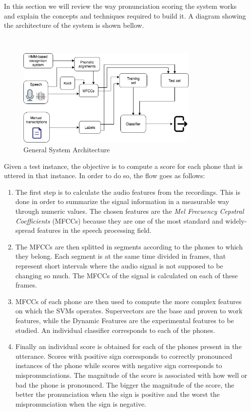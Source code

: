In this section we will review the way pronunciation scoring the system works
and explain the concepts and techniques required to build it. A diagram showing
the architecture of the system is shown bellow.

~

\begin{figure}[H]
	\centering
	\includegraphics[width=0.8\textwidth]{files/figures/method/general-structure.jpg}
	\caption{General System Architecture}
	\label{fig:methodGeneralArchitecture}
\end{figure}

Given a test instance, the objective is to compute a score for each phone that
is uttered in that instance. In order to do so, the flow goes as follows:

\begin{enumerate}
 \item The first step is to calculate the audio features from the recordings.
 This is done in order to summarize the signal information
 in a measurable way through numeric values. The chosen features
 are the \textit{Mel Frecuency Cepstral Coefficients} (MFCCs) because they are one of the
 most standard and widely-spread features in the speech processing field.
 \item The MFCCs are then splitted in segments according to the phones to which they
 belong. Each segment is at the same time divided in frames, that represent short
 intervals where the audio signal is not supposed to be changing so much. The MFCCs of
 the signal is calculated on each of these frames.
 \item MFCCs of each phone are then used to compute the more complex features
 on which the SVMs operates. Supervectors are the base and proven to work features,
 while the Dynamic Features are the experimental features to be studied.
 An individual classifier corresponds to each of the phones.
 \item Finally an individual score is obtained for each of the phones present in the
 utterance. Scores with positive sign corresponds to correctly pronounced instances of the phone
 while scores with negative sign corresponds to mispronunciations. The magnitude of the score
 is associated with how well or bad the phone is pronounced.
 The bigger the magnitude of the score, the better the pronunciation when the sign is positive
 and the worst the mispronunciation when the sign is negative.
\end{enumerate}

